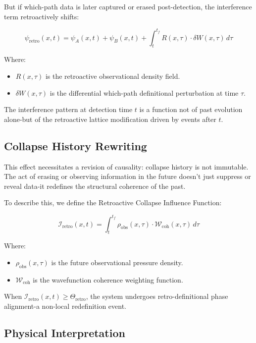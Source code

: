 But if which-path data is later captured or erased post-detection, the interference term retroactively shifts:

\[
\psi_{\text{retro}}(x,t) = \psi_A(x,t) + \psi_B(x,t) + \int_{t}^{t_f} R(x,\tau) \cdot \delta W(x,\tau) \, d\tau
\]

Where:
\begin{itemize}
    \item \( R(x,\tau) \) is the retroactive observational density field.
    \item \( \delta W(x,\tau) \) is the differential which-path definitional perturbation at time \( \tau \).
\end{itemize}

The interference pattern at detection time \( t \) is a function not of past evolution alone-but of the retroactive lattice modification driven by events after \( t \).

\subsection{Collapse History Rewriting}

This effect necessitates a revision of causality: collapse history is not immutable. The act of erasing or observing information in the future doesn't just suppress or reveal data-it redefines the structural coherence of the past.

To describe this, we define the Retroactive Collapse Influence Function:

\begin{equation}
\mathcal{I}_{\text{retro}}(x,t) = \int_{t}^{t_f} \rho_{\text{obs}}(x,\tau) \cdot \mathcal{W}_{\text{coh}}(x,\tau) \, d\tau
\end{equation}

Where:
\begin{itemize}
    \item \( \rho_{\text{obs}}(x,\tau) \) is the future observational pressure density.
    \item \( \mathcal{W}_{\text{coh}} \) is the wavefunction coherence weighting function.
\end{itemize}

When \( \mathcal{I}_{\text{retro}}(x,t) \geq \Theta_{\text{retro}} \), the system undergoes retro-definitional phase alignment-a non-local redefinition event.

\subsection{Physical Interpretation}

